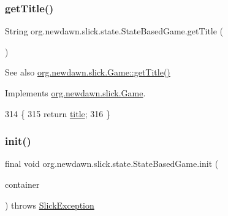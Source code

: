 \subsubsection{\texorpdfstring{get\+Title()}{getTitle()}}
{\footnotesize\ttfamily String org.\+newdawn.\+slick.\+state.\+State\+Based\+Game.\+get\+Title (\begin{DoxyParamCaption}{ }\end{DoxyParamCaption})\hspace{0.3cm}{\ttfamily [inline]}}

\begin{DoxySeeAlso}{See also}
\mbox{\hyperlink{interfaceorg_1_1newdawn_1_1slick_1_1_game_ae02a95991618c4aec2038d8d482be0d2}{org.\+newdawn.\+slick.\+Game\+::get\+Title()}} 
\end{DoxySeeAlso}


Implements \mbox{\hyperlink{interfaceorg_1_1newdawn_1_1slick_1_1_game_ae02a95991618c4aec2038d8d482be0d2}{org.\+newdawn.\+slick.\+Game}}.


\begin{DoxyCode}
314                              \{
315         \textcolor{keywordflow}{return} \mbox{\hyperlink{classorg_1_1newdawn_1_1slick_1_1state_1_1_state_based_game_ad5ae50bad0540ad69248f69f663aef33}{title}};
316     \}
\end{DoxyCode}
\mbox{\label{classorg_1_1newdawn_1_1slick_1_1state_1_1_state_based_game_aa272bccd1d7e57478dd49cc01ccf4c36}} 
\subsubsection{\texorpdfstring{init()}{init()}}
{\footnotesize\ttfamily final void org.\+newdawn.\+slick.\+state.\+State\+Based\+Game.\+init (\begin{DoxyParamCaption}\item[{\mbox{\hyperlink{classorg_1_1newdawn_1_1slick_1_1_game_container}{Game\+Container}}}]{container }\end{DoxyParamCaption}) throws \mbox{\hyperlink{classorg_1_1newdawn_1_1slick_1_1_slick_exception}{Slick\+Exception}}\hspace{0.3cm}{\ttfamily [inline]}}

